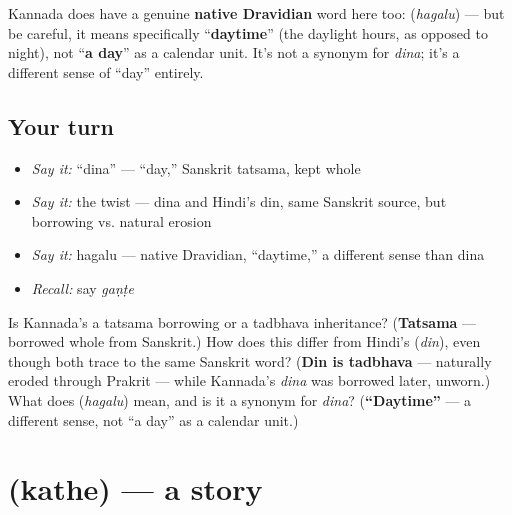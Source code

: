 \begin{cousinweb}
Kannada does have a genuine \textbf{native Dravidian} word here too: \textbf{} (\emph{hagalu}) — but be careful, it means specifically \textquotedblleft{}\textbf{daytime}\textquotedblright{} (the daylight hours, as opposed to night), not \textquotedblleft{}\textbf{a day}\textquotedblright{} as a calendar unit. It's not a synonym for \emph{dina}; it's a different sense of \textquotedblleft{}day\textquotedblright{} entirely.
\end{cousinweb}

\subsection*{Your turn}
\begin{itemize}
\raggedright
  \item \emph{Say it:} \textquotedblleft{}dina\textquotedblright{} — \textquotedblleft{}day,\textquotedblright{} Sanskrit tatsama, kept whole
  \item \emph{Say it:} the twist — dina and Hindi's din, same Sanskrit source, but borrowing vs. natural erosion
  \item \emph{Say it:} hagalu — native Dravidian, \textquotedblleft{}daytime,\textquotedblright{} a different sense than dina
  \item \emph{Recall:} say \emph{gaṇṭe}
\end{itemize}

\begin{tcolorbox}[breakable,colback=teal!4,colframe=teal!35!black,title={Before you move on}]
Is Kannada's \textbf{} a tatsama borrowing or a tadbhava inheritance? (\textbf{Tatsama} — borrowed whole from Sanskrit.) How does this differ from Hindi's \textbf{} (\emph{din}), even though both trace to the same Sanskrit word? (\textbf{Din is tadbhava} — naturally eroded through Prakrit — while Kannada's \emph{dina} was borrowed later, unworn.) What does \textbf{} (\emph{hagalu}) mean, and is it a synonym for \emph{dina}? (\textbf{\textquotedblleft{}Daytime\textquotedblright{}} — a different sense, not \textquotedblleft{}a day\textquotedblright{} as a calendar unit.)
\end{tcolorbox}
\section[\texorpdfstring{\kn{ಕಥೆ} (kathe)}{ಕಥೆ (kathe)}]{ (kathe) — a story}

\label{lesson:KA-C23-kathe}



